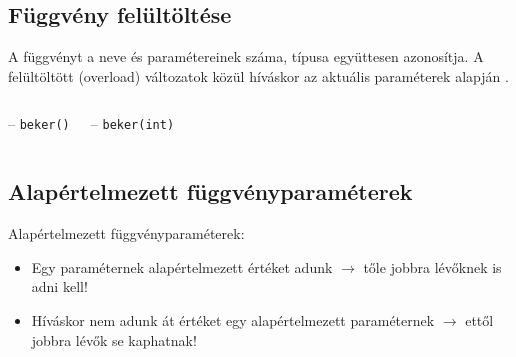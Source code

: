 \documentclass[usenames,dvipsnames,aspectratio=169]{beamer}
\begin{document}
\begin{frame}
  \begin{exampleblock}{}
    \vspace{-.2cm}
    
    \vspace{-.2cm}
  \end{exampleblock}
\end{frame}

\subsection{Függvény felültöltése}
\begin{frame}
  \small
  A függvényt a neve és paramétereinek száma, típusa együttesen azonosítja. A felültöltött (overload) változatok közül  
  híváskor az aktuális paraméterek alapján .
  \begin{columns}[T]
      \begin{exampleblock}{ -- \texttt{beker()}}
        \scriptsize
        
      \end{exampleblock}
      \begin{exampleblock}{ -- \texttt{beker(int)}}
        \scriptsize
        
      \end{exampleblock}
  \end{columns}
\end{frame}

\subsection{Alapértelmezett függvényparaméterek}
\begin{frame}
  Alapértelmezett függvényparaméterek: 
  \begin{itemize}
    \small
    \item Egy paraméternek alapértelmezett értéket adunk $\to$ tőle jobbra lévőknek is adni kell!
    \item Híváskor nem adunk át értéket egy alapértelmezett paraméternek $\to$ ettől jobbra lévők se kaphatnak!
  \end{itemize}
  \begin{exampleblock}{}
    \scriptsize
    \vspace{-.2cm}
    
    \vspace{-.2cm}
  \end{exampleblock}
\end{frame}
\end{document}
